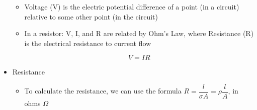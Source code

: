 \begin{itemize}
    \begin{itemize}

      \item Voltage (V) is the electric potential difference of a point (in a circuit) relative to some other point (in the circuit)

      \item In a resistor: V, I, and R are related by Ohm's Law, where Resistance (R) is the electrical resistance to current flow

        $$V=IR$$

    \end{itemize}

  \item Resistance

    \begin{itemize}

      \item To calculate the resistance, we can use the formula $R=\dfrac{l}{\sigma A}=\rho\dfrac{l}{A}$, in ohms $\Omega$

    \end{itemize}

\end{itemize}



